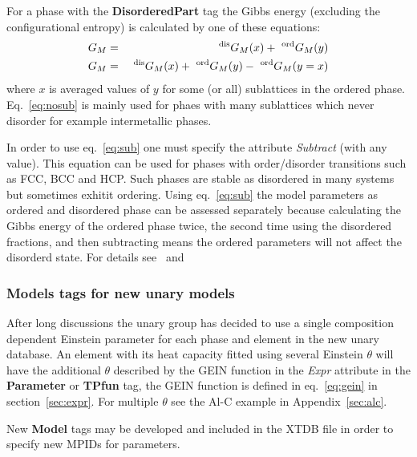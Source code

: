 \documentclass{article}
\begin{document}
For a phase with the {\bf DisorderedPart} tag the Gibbs energy
(excluding the configurational entropy) is calculated by one of these
equations:
\begin{eqnarray}
G_M &=& ~^{\rm dis}G_M(x) + ~^{\rm ord}G_M(y) \label{eq:nosub}\\
G_M &=& ~^{\rm dis}G_M(x) + ~^{\rm ord}G_M(y) - ~^{\rm ord}G_M(y=x) \label{eq:sub}
\end{eqnarray}
where $x$ is averaged values of $y$ for some (or all) sublattices in
the ordered phase.  Eq.~\ref{eq:nosub} is mainly used for phaes with
many sublattices which never disorder for example intermetallic
phases.

In order to use eq.~\ref{eq:sub} one must specify the attribute {\em
  Subtract} (with any value).  This equation can be used for phases
with order/disorder transitions such as FCC, BCC and HCP.  Such phases
are stable as disordered in many systems but sometimes exhitit
ordering.  Using eq.~\ref{eq:sub} the model parameters as ordered and
disordered phase can be assessed separately because calculating the
Gibbs energy of the ordered phase twice, the second time using the
disordered fractions, and then subtracting means the ordered
parameters will not affect the disorderd state.  For details
see~\cite{97Ans} and~\cite{07Hal}

\subsubsection{Models tags for new unary models}

After long discussions the unary group has decided to use a single
composition dependent Einstein parameter for each phase and element in
the new unary database.  An element with its heat capacity fitted
using several Einstein $\theta$ will have the additional $\theta$
described by the GEIN function in the {\em Expr} attribute in the {\bf
  Parameter} or {\bf TPfun} tag, the GEIN function is defined in
eq.~\ref{eq:gein} in section~\ref{sec:expr}.  For multiple $\theta$
see the Al-C example in Appendix~\ref{sec:alc}.

New {\bf Model} tags may be developed and included in the XTDB file in
order to specify new MPIDs for parameters.
\end{document}
